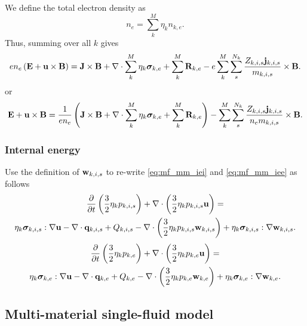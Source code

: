 \documentclass[a4paper,11pt]{report}
\begin{document}
We define the total electron density as 
\begin{equation*}
    n_e = \sum_k^M \eta_k n_{k,e}.
\end{equation*}
Thus, summing over all $k$ gives
\begin{equation*}
    e n_e \left( \mathbf{E} + \mathbf{u} \times \mathbf{B} \right) = \mathbf{J} \times \mathbf{B} + \nabla \cdot \sum_k^M \eta_k \bm \sigma_{k,e} + \sum_k^M \mathbf{R}_{k,e} - e \sum_k^M \sum_s^{N_k} \frac{Z_{k,i,s} \mathbf{j}_{k,i,s}}{m_{k,i,s}} \times \mathbf{B}.
\end{equation*}
or
\begin{equation}
    \mathbf{E} + \mathbf{u} \times \mathbf{B} = \frac{1}{e n_e} \left( \mathbf{J} \times \mathbf{B} + \nabla \cdot \sum_k^M \eta_k \bm \sigma_{k,e} + \sum_k^M \mathbf{R}_{k,e} \right) - \sum_k^M \sum_s^{N_k} \frac{Z_{k,i,s} \mathbf{j}_{k,i,s}}{n_e m_{k,i,s}} \times \mathbf{B}.
\end{equation}

\subsubsection{Internal energy}

Use the definition of $\mathbf{w}_{k,i,s}$ to re-write \cref{eq:mf_mm_iei} and \cref{eq:mf_mm_iee} as follows
\begin{multline*}
    \frac{\partial}{\partial t} \left( \frac{3}{2} \eta_k p_{k,i,s} \right) + \nabla \cdot \left( \frac{3}{2} \eta_k p_{k,i,s} \mathbf{u} \right) = \\
    \eta_k \bm \sigma_{k,i,s} : \nabla \mathbf{u} - \nabla \cdot \mathbf{q}_{k,i,s} + Q_{k,i,s} - \nabla \cdot \left( \frac{3}{2} \eta_k p_{k,i,s} \mathbf{w}_{k,i,s} \right) + \eta_k \bm \sigma_{k,i,s} : \nabla \mathbf{w}_{k,i,s} .
\end{multline*}
\begin{multline*}
    \frac{\partial}{\partial t} \left( \frac{3}{2} \eta_k p_{k,e} \right) + \nabla \cdot \left( \frac{3}{2} \eta_k p_{k,e} \mathbf{u} \right) = \\
    \eta_k \bm \sigma_{k,e} : \nabla \mathbf{u} - \nabla \cdot \mathbf{q}_{k,e} + Q_{k,e} - \nabla \cdot \left( \frac{3}{2} \eta_k p_{k,e} \mathbf{w}_{k,e} \right) + \eta_k \bm \sigma_{k,e} : \nabla \mathbf{w}_{k,e}.
\end{multline*}

\subsection{Multi-material single-fluid model}
\label{sec:sf_mm_ms}
\end{document}
